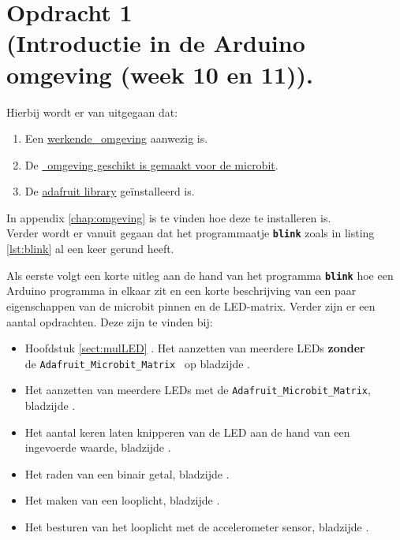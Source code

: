 \chapter{Opdracht 1\\  \small (Introductie in de Arduino omgeving (week 10 en 11)).}
\label{chap:intr}

Hierbij wordt er van uitgegaan dat:
\begin{enumerate}[label=\alph*)]
	\item Een \hyperref[sec:insArd]{ werkende \ardIDE ~omgeving} aanwezig is.
	\item De \hyperref[sec:instArdOmg] {\ardIDE ~omgeving geschikt is gemaakt voor de microbit}.
	\item De \hyperref[sec:insAdafruit]{ adafruit library} geïnstalleerd is.
\end{enumerate}	 
	 In appendix \ref{chap:omgeving} is te vinden hoe deze te installeren is.\\
	 Verder wordt er vanuit gegaan dat het programmaatje \texttt{\textbf{blink}} zoals in listing \ref{lst:blink} al een keer gerund heeft.

\label{chap:tweeVerv}
Als eerste volgt een korte uitleg aan de hand van het programma \texttt{\textbf{blink}} hoe een Arduino programma in elkaar zit en een korte beschrijving van een paar eigenschappen van de microbit pinnen en de LED-matrix. Verder zijn er een aantal opdrachten. Deze zijn te vinden bij:

\begin{itemize}
	\item Hoofdstuk \ref{sect:mulLED} . Het aanzetten van meerdere LEDs\textbf{ zonder}\\ de \texttt{Adafruit\_Microbit\_Matrix } op bladzijde \pageref{sect:mulLED}.
	\item Het aanzetten van meerdere LEDs met de \texttt{Adafruit\_Microbit\_Matrix}, bladzijde \pageref{blz:opdrmLEDSmatrix}.
	\item Het aantal keren laten knipperen van de LED aan de hand van een ingevoerde waarde, bladzijde \pageref{blad:aantalknipper}. 
	\item Het raden van een binair getal, bladzijde \pageref{blz:bineairGetal}.
	\item Het maken van een looplicht, bladzijde  \pageref{opdr:loppl}.
	\item Het besturen van het looplicht met de accelerometer sensor, bladzijde \pageref{opdr:accSens}.
\end{itemize} 


